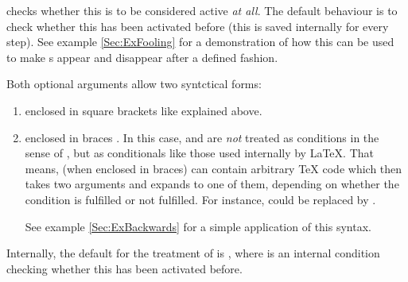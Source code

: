 \documentclass[12pt]{scrartcl}
\let\newslide=\relax
\begin{document}
   checks whether this  is to be considered active \emph{at all}. The default
  behaviour is to check whether this  has been activated before (this is saved internally for every
  step). See example \ref{Sec:ExFooling} for a demonstration of how this can be used to make s appear
  and disappear after a defined fashion.

  Both optional arguments allow two syntctical forms:
  \begin{enumerate}
  \item enclosed in square brackets \code{[]} like explained above.
  \item enclosed in braces \code{()}. In this case,  and  are \emph{not} treated as
    conditions in the sense of , but as conditionals like those used internally by \LaTeX. That
    means,  (when enclosed in braces) can contain arbitrary \TeX{} code which then takes two
    arguments and expands to one of them, depending on whether the condition is fulfilled or not fulfilled. For
    instance,  could be replaced by
    .

    See example \ref{Sec:ExBackwards} for a simple application of this syntax.
  \end{enumerate}

  Internally, the default for the treatment of  is , where
   is an internal condition checking whether this  has been activated before.

  \newslide
\end{document}
